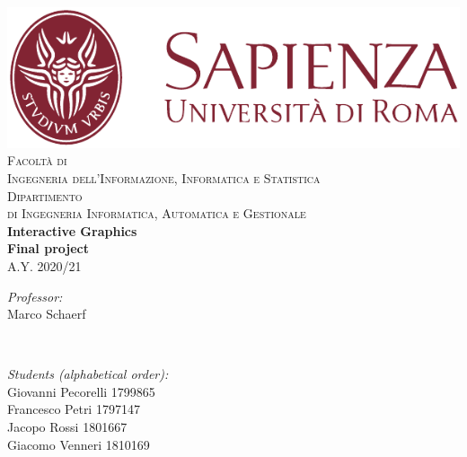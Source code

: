 \documentclass[a4paper]{report}
\begin{document}
\makeatletter
\let\theauthor\@author
\let\thedate\@date
\makeatother

\begin{titlepage}
	\centering
    \vspace*{0.5 cm}
    \includegraphics{images/sapienza-MLred-pos}\\[1.0 cm]	%
    \vspace*{-0.5cm}
    \textsc{\large Facoltà di \\Ingegneria dell'Informazione, Informatica e Statistica}\\[0.5 cm]	%
    \textsc{\large Dipartimento \\di Ingegneria Informatica, Automatica e Gestionale}\\[0.5 cm]	%
    \textbf{\large Interactive Graphics}\\[0.1 cm]
    \textbf{\large Final project}\\[2.0 cm]
    \textsc{\large A.Y. 2020/21}\\[2.0 cm]
    { \fontsize{20.74pt}{18.5pt}\selectfont\bfseries \par } %
    \begin{figure}[htbp]
    \centering
    
    \end{figure}
    \vspace*{3cm}
	\begin{minipage}{0.4\textwidth}
		\begin{flushleft} \large
			\emph{Professor:}\\
			Marco Schaerf\\
		\end{flushleft}
	\end{minipage}~
	\begin{minipage}{0.4\textwidth}
		\begin{flushright} \large
			\emph{Students (alphabetical order):} \\
            Giovanni Pecorelli 1799865\\
            Francesco Petri 1797147\\
            Jacopo Rossi 1801667\\
            Giacomo Venneri 1810169
		\end{flushright}
	\end{minipage}\\[2 cm]
\end{titlepage}

\tableofcontents
\newpage

\setlength{\parskip}{1em}
















\end{document}
